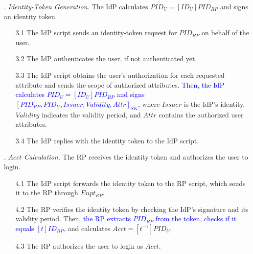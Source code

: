 . {\em Identity-Token Generation.}
The IdP calculates $PID_U = [ID_U]{PID_{RP}}$ and signs an identity token. %
\vspace{-\topsep}
\begin{itemize}
\setlength{\topsep}{0pt}
\setlength{\partopsep}{0pt}
\setlength{\itemsep}{0pt}
\setlength{\parsep}{0pt}
\setlength{\parskip}{0pt}
\item[3.1]
The IdP script sends an identity-token request for $PID_{RP}$ on behalf of the user. %

\item[3.2] The IdP authenticates the user, if not authenticated yet.

\item [3.3]
The IdP script obtains the user's authorization for each requested attribute and sends the scope of authorized attributes. %
\textcolor{blue}{Then, the IdP %
    calculates $PID_U = [ID_U]{PID_{RP}}$ %
and signs $[PID_{RP}, PID_U, Issuer, Validity, Attr]_{SK}$,}
 where $Issuer$ is the IdP's identity, $Validity$ indicates the validity period, and $Attr$ contains the authorized user attributes.
\item[3.4] The IdP replies with the identity token to the IdP script.
\end{itemize}

. {\em $Acct$ Calculation.}
The RP receives the identity token and authorizes the user to login.
\vspace{-\topsep}
\begin{itemize}
\setlength{\topsep}{0pt}
\setlength{\partopsep}{0pt}
\setlength{\itemsep}{0pt}
\setlength{\parsep}{0pt}
\setlength{\parskip}{0pt}
\item [4.1]
The IdP script forwards the identity token to the RP script,
    which sends it to the RP through $Enpt_{RP}$.
\item[4.2] The RP verifies the identity token by checking the IdP's signature and its validity period.
Then, \textcolor{blue}{the RP extracts $PID_{RP}$ from the token, checks if it equals $[t]ID_{RP}$,}
and calculates $Acct = [t^{-1}]{PID_U}$.

\item [4.3] The RP authorizes the user to login as $Acct$.

\end{itemize}


